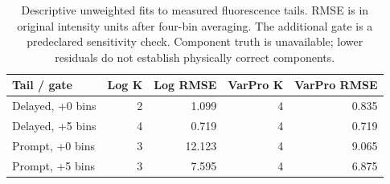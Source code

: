 \begin{table}[htbp]
\centering\small
\caption{Descriptive unweighted fits to measured fluorescence tails. RMSE is in original intensity units after four-bin averaging. The additional gate is a predeclared sensitivity check. Component truth is unavailable; lower residuals do not establish physically correct components.}\label{tab:experimental}
\begin{tabular}{@{}lrrrr@{}}
\toprule
Tail / gate & Log K & Log RMSE & VarPro K & VarPro RMSE \\
\midrule
Delayed, +0 bins & 2 & 1.099 & 4 & 0.835 \\
Delayed, +5 bins & 4 & 0.719 & 4 & 0.719 \\
Prompt, +0 bins & 3 & 12.123 & 4 & 9.065 \\
Prompt, +5 bins & 3 & 7.595 & 4 & 6.875 \\
\bottomrule
\end{tabular}
\end{table}
